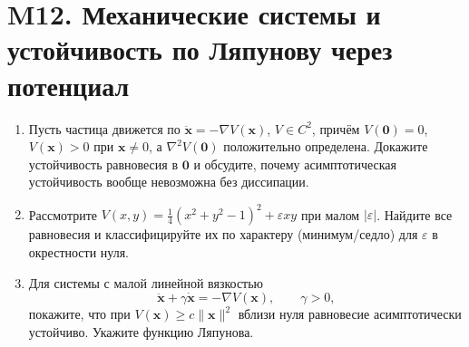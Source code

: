\documentclass[12pt]{article}
\begin{document}
\section{M12. Механические системы и устойчивость по Ляпунову через потенциал}
\begin{enumerate}
\item Пусть частица движется по $\ddot{\mathbf x}=-\nabla V(\mathbf x)$, $V\in C^2$, причём $V(\mathbf 0)=0$, $V(\mathbf x)>0$ при $\mathbf x\ne 0$, а $\nabla^2 V(\mathbf 0)$ положительно определена. Докажите устойчивость равновесия в $\mathbf 0$ и обсудите, почему асимптотическая устойчивость вообще невозможна без диссипации.

\item Рассмотрите $V(x,y)=\tfrac14(x^2+y^2-1)^2+\varepsilon xy$ при малом $|\varepsilon|$. Найдите все равновесия и классифицируйте их по характеру (минимум/седло) для $\varepsilon$ в окрестности нуля.

\item Для системы с малой линейной вязкостью
\[
\ddot{\mathbf x}+\gamma \dot{\mathbf x} = -\nabla V(\mathbf x),\qquad \gamma>0,
\]
покажите, что при $V(\mathbf x)\ge c\|\mathbf x\|^2$ вблизи нуля равновесие асимптотически устойчиво. Укажите функцию Ляпунова.
\end{enumerate}

\end{document}
